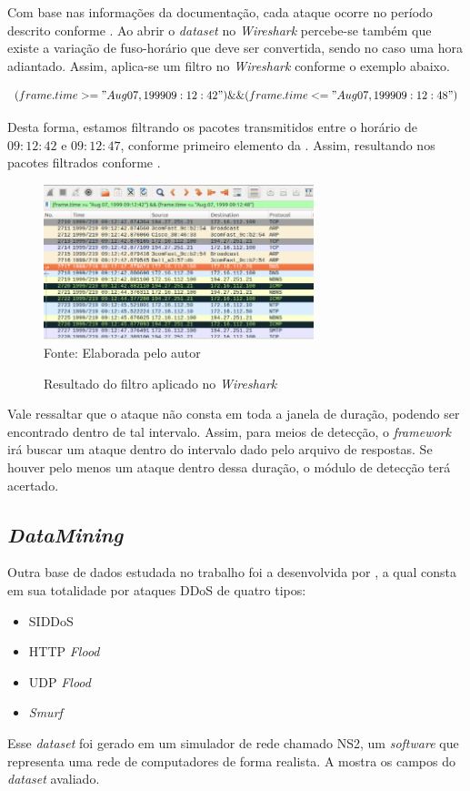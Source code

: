  Com base nas informações da documentação, cada ataque ocorre no período descrito conforme .  Ao abrir o \textit{dataset} no \textit{Wireshark} percebe-se também que existe a variação de fuso-horário que deve ser convertida, sendo no caso uma hora adiantado. Assim, aplica-se um filtro no \textit{Wireshark} conforme o exemplo abaixo.
 
 \begin{equation}
 	(frame.time >= "Aug 07, 1999 09:12:42") \&\& (frame.time <= "Aug 07, 1999 09:12:48")
 \end{equation} 
 
 Desta forma, estamos filtrando os pacotes transmitidos entre o horário de $09:12:42$ e $09:12:47$, conforme primeiro elemento da . Assim, resultando nos pacotes filtrados conforme .

 \begin{figure}[ht]
 	\centering
 	\caption{Resultado do filtro aplicado no \textit{Wireshark} }
 	\includegraphics[width=0.7\textwidth]{figs/filtWireshark1.png}\\
 	{Fonte: Elaborada pelo autor}
 	\label{fig:wiresharkFilt}
 \end{figure} 
 
Vale ressaltar que o ataque não consta em toda a janela de duração, podendo ser encontrado dentro de tal intervalo. Assim, para meios de detecção, o \textit{framework} irá buscar um ataque dentro do intervalo dado pelo arquivo de respostas. Se houver pelo menos um ataque dentro dessa duração, o módulo de detecção terá acertado.
\subsection{\textit{DataMining}}
Outra base de dados estudada no trabalho foi a desenvolvida por \cite{DataMining}, a qual consta em sua totalidade por ataques DDoS de quatro tipos:
\begin{itemize}
	\item SIDDoS
	\item HTTP \textit{Flood}
	\item UDP \textit{Flood}
	\item \textit{Smurf}
\end{itemize}
Esse \textit{dataset} foi gerado em um simulador de rede chamado NS2, um \textit{software} que representa uma rede de computadores de forma realista. 
A  mostra os campos do \textit{dataset} avaliado. 

